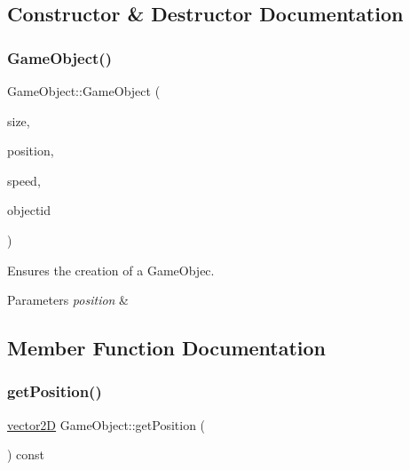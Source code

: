 \subsection{Constructor \& Destructor Documentation}
\mbox{\label{class_game_object_aeff3db3107cbe82af96169ed5b69c09e}} 
\subsubsection{\texorpdfstring{Game\+Object()}{GameObject()}}
{\footnotesize\ttfamily Game\+Object\+::\+Game\+Object (\begin{DoxyParamCaption}\item[{const \mbox{\hyperlink{classvector2_d}{vector2D}} \&}]{size,  }\item[{const \mbox{\hyperlink{classvector2_d}{vector2D}} \&}]{position,  }\item[{float}]{speed,  }\item[{Object\+ID}]{objectid }\end{DoxyParamCaption})}



Ensures the creation of a Game\+Objec. 


\begin{DoxyParams}{Parameters}
{\em position} & \\
\hline
\end{DoxyParams}


\subsection{Member Function Documentation}
\mbox{\label{class_game_object_a384f1b162b685cbeb8f0c70c03392664}} 
\subsubsection{\texorpdfstring{get\+Position()}{getPosition()}}
{\footnotesize\ttfamily \mbox{\hyperlink{classvector2_d}{vector2D}} Game\+Object\+::get\+Position (\begin{DoxyParamCaption}{ }\end{DoxyParamCaption}) const\hspace{0.3cm}{\ttfamily [inline]}}



